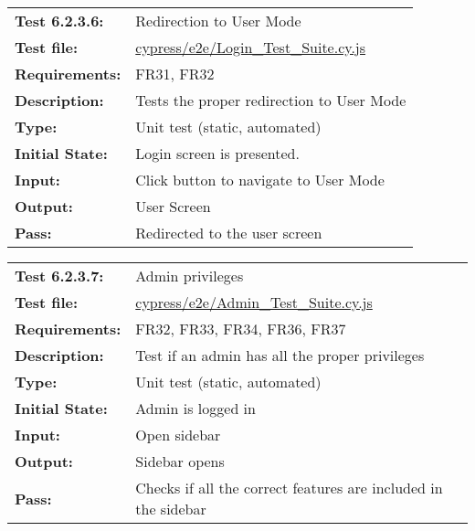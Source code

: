 \documentclass[12pt, titlepage]{article}
\begin{document}
\textcolor{red}{
\begin{center}
\begin{tabular}{|l|p{10cm}|}
    \hline
    \bf{Test} 6.2.3.6: & Redirection to User Mode \\
    \bf{Test file: } &
    \href{https://github.com/parkd-app/park-d/blob/main/src/park-d-front-end/src/cypress/e2e/Login_Test_Suite.cy.js}{cypress/e2e/Login\_Test\_Suite.cy.js}\\
    \bf{Requirements}: & FR31, FR32\\
    \bf{Description}: & Tests the proper redirection to User Mode \\
    \bf{Type}: & Unit test (static, automated) \\
    \bf{Initial State}: & Login screen is presented. \\
    \bf{Input}: &  Click button to navigate to User Mode\\
    \bf{Output}: & User Screen \\
    \bf{Pass}: &  Redirected to the user screen\\
    \hline
\end{tabular}
\end{center}}

\textcolor{red}{
\begin{center}
\begin{tabular}{|l|p{10cm}|}
    \hline
    \bf{Test} 6.2.3.7: & Admin privileges \\
    \bf{Test file: } &
    \href{https://github.com/parkd-app/park-d/blob/main/src/park-d-front-end/src/cypress/e2e/Admin_Test_Suite.cy.js}{cypress/e2e/Admin\_Test\_Suite.cy.js}\\
    \bf{Requirements}: & FR32, FR33, FR34, FR36, FR37\\
    \bf{Description}: & Test if an admin has all the proper privileges\\
    \bf{Type}: & Unit test (static, automated) \\
    \bf{Initial State}: & Admin is logged in\\
    \bf{Input}: &  Open sidebar\\
    \bf{Output}: & Sidebar opens\\
    \bf{Pass}: & Checks if all the correct features are included in the sidebar
    \\
    \hline
\end{tabular}
\end{center}}
\end{document}
